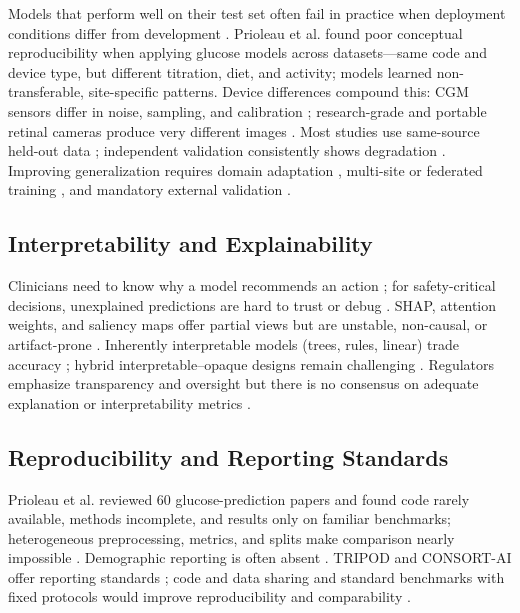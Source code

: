 Models that perform well on their test set often fail in practice when deployment conditions differ from development \cite{prioleau2025deep, zhu2021deep, zhou2023population}. Prioleau et al. \cite{prioleau2025deep} found poor conceptual reproducibility when applying glucose models across datasets—same code and device type, but different titration, diet, and activity; models learned non-transferable, site-specific patterns. Device differences compound this: CGM sensors differ in noise, sampling, and calibration \cite{alhaddad2022sense, prioleau2025deep, xie2024processing}; research-grade and portable retinal cameras produce very different images \cite{zhang2025systematic, raj2024federated}. Most studies use same-source held-out data \cite{prioleau2025deep, jacobs2023artificial}; independent validation consistently shows degradation \cite{prioleau2025deep, wang2024ai}. Improving generalization requires domain adaptation \cite{contreras2018artificial, chen2024crossmodality}, multi-site or federated training \cite{bai2024federated, fahmy2025exploring, raj2024federated}, and mandatory external validation \cite{prioleau2025deep, wang2024ai}.

\subsection{Interpretability and Explainability}

Clinicians need to know why a model recommends an action \cite{jacobs2023artificial, mackenzie2023diabetes}; for safety-critical decisions, unexplained predictions are hard to trust or debug \cite{contreras2018artificial, mackenzie2023diabetes}. SHAP, attention weights, and saliency maps offer partial views \cite{lundberg2017shap, munoz2023shap, chadaga2024interpretable, alam2024machine, bhati2024interpretable, zhu2021deep} but are unstable, non-causal, or artifact-prone \cite{jacobs2023artificial, alam2024machine, zhu2021deep, mackenzie2023diabetes}. Inherently interpretable models (trees, rules, linear) trade accuracy \cite{contreras2018artificial, alam2024machine}; hybrid interpretable–opaque designs remain challenging \cite{zhu2021deep}. Regulators emphasize transparency and oversight \cite{mackenzie2023diabetes, khalifa2024artificial} but there is no consensus on adequate explanation or interpretability metrics \cite{jacobs2023artificial}.

\subsection{Reproducibility and Reporting Standards}

Prioleau et al. \cite{prioleau2025deep} reviewed 60 glucose-prediction papers and found code rarely available, methods incomplete, and results only on familiar benchmarks; heterogeneous preprocessing, metrics, and splits make comparison nearly impossible \cite{jacobs2023artificial}. Demographic reporting is often absent \cite{wang2024ai, prioleau2025deep}. TRIPOD and CONSORT-AI offer reporting standards \cite{wang2024ai, liu2025scoping}; code and data sharing and standard benchmarks with fixed protocols would improve reproducibility and comparability \cite{prioleau2025deep, jacobs2023artificial}.
